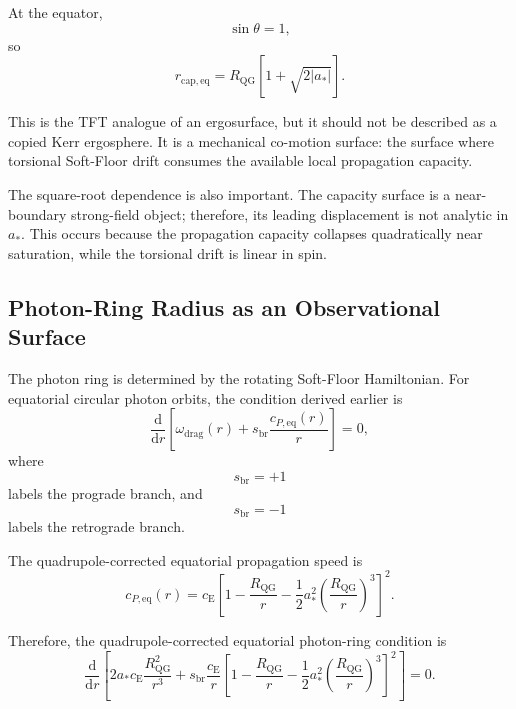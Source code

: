 At the equator,
\begin{equation}
    \sin\theta = 1,
\end{equation}
so
\begin{equation}
    \boxed{ r_{\mathrm{cap,eq}} = R_{\mathrm{QG}} \left[ 1+\sqrt{2|a_\ast|} \right]. }
\end{equation}

This is the TFT analogue of an ergosurface, but it should not be described as a copied Kerr ergosphere. It is a mechanical co-motion surface: the surface where torsional Soft-Floor drift consumes the available local propagation capacity.

The square-root dependence is also important. The capacity surface is a near-boundary strong-field object; therefore, its leading displacement is not analytic in $a_\ast$. This occurs because the propagation capacity collapses quadratically near saturation, while the torsional drift is linear in spin.

\subsection{Photon-Ring Radius as an Observational Surface}

The photon ring is determined by the rotating Soft-Floor Hamiltonian. For equatorial circular photon orbits, the condition derived earlier is
\begin{equation}
    \frac{\mathrm{d}}{\mathrm{d}r} \left[ \omega_{\mathrm{drag}}(r) + s_{\mathrm{br}} \frac{c_{P,\mathrm{eq}}(r)}{r} \right] = 0,
\end{equation}
where
\begin{equation}
    s_{\mathrm{br}} = +1
\end{equation}
labels the prograde branch, and
\begin{equation}
    s_{\mathrm{br}} = -1
\end{equation}
labels the retrograde branch.

The quadrupole-corrected equatorial propagation speed is
\begin{equation}
    c_{P,\mathrm{eq}}(r) = c_{\mathrm{E}} \left[ 1 - \frac{R_{\mathrm{QG}}}{r} - \frac{1}{2}a_\ast^2 \left( \frac{R_{\mathrm{QG}}}{r} \right)^3 \right]^2.
\end{equation}

Therefore, the quadrupole-corrected equatorial photon-ring condition is
\begin{equation}
    \boxed{ \frac{\mathrm{d}}{\mathrm{d}r} \left[ 2a_\ast c_{\mathrm{E}} \frac{R_{\mathrm{QG}}^2}{r^3} + s_{\mathrm{br}} \frac{c_{\mathrm{E}}}{r} \left[ 1 - \frac{R_{\mathrm{QG}}}{r} - \frac{1}{2}a_\ast^2 \left( \frac{R_{\mathrm{QG}}}{r} \right)^3 \right]^2 \right] = 0. }
\end{equation}

